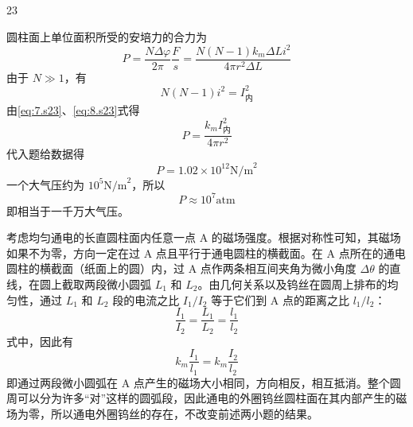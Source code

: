 \begin{solution}{23}
\begin{subsolution}
\begin{equation}
            \label{eq:6.s23}
        \end{equation}
        圆柱面上单位面积所受的安培力的合力为
        \begin{equation}
            P = \frac{N\Delta\varphi}{2\pi}\frac{F}{s} = \frac{N(N-1)k_m \Delta L i^2}{4\pi r^2 \Delta L}
            \label{eq:7.s23}
        \end{equation}
        由于 $N \gg 1$，有
        \begin{equation}
            N(N-1)i^2 = I_{\text{内}}^2
            \label{eq:8.s23}
        \end{equation}
        由\eqref{eq:7.s23}、\eqref{eq:8.s23}式得
        \begin{equation}
            P = \frac{k_m I_{\text{内}}^2}{4\pi r^2}
            \label{eq:9.s23}
        \end{equation}
        代入题给数据得
        \begin{equation}
            P = 1.02 \times 10^{12} \mathrm{N/m}^2
            \label{eq:10.s23}
        \end{equation}
        一个大气压约为 $10^5 \mathrm{N/m}^2$，所以
        \begin{equation}
            P \approx 10^7 \mathrm{atm}
            \label{eq:11.s23}
        \end{equation}
        即相当于一千万大气压。
    \end{subsolution}
    \begin{subsolution}
        考虑均匀通电的长直圆柱面内任意一点 A 的磁场强度。根据对称性可知，其磁场如果不为零，方向一定在过 A 点且平行于通电圆柱的横截面。在 A 点所在的通电圆柱的横截面（纸面上的圆）内，过 A 点作两条相互间夹角为微小角度 $\Delta\theta$ 的直线，在圆上截取两段微小圆弧 $L_1$ 和 $L_2$。由几何关系以及钨丝在圆周上排布的均匀性，通过 $L_1$ 和 $L_2$ 段的电流之比 $I_1/I_2$ 等于它们到 A 点的距离之比 $l_1/l_2$：
        \begin{equation}
            \frac{I_1}{I_2} = \frac{L_1}{L_2} = \frac{l_1}{l_2}
            \label{eq:12.s23}
        \end{equation}
        式中，因此有
        \begin{equation}
            k_m\frac{I_1}{l_1} = k_m\frac{I_2}{l_2}
            \label{eq:13.s23}
        \end{equation}
        即通过两段微小圆弧在 A 点产生的磁场大小相同，方向相反，相互抵消。整个圆周可以分为许多“对”这样的圆弧段，因此通电的外圈钨丝圆柱面在其内部产生的磁场为零，所以通电外圈钨丝的存在，不改变前述两小题的结果。
    \end{subsolution}

\end{solution}
